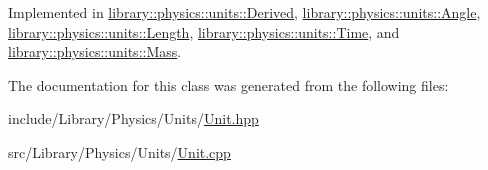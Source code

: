 Implemented in \hyperlink{classlibrary_1_1physics_1_1units_1_1_derived_a3626d6c77e6753f44232067856fde9d1}{library\+::physics\+::units\+::\+Derived}, \hyperlink{classlibrary_1_1physics_1_1units_1_1_angle_aae6b7bd4e028ea7719f5a712ca19a86c}{library\+::physics\+::units\+::\+Angle}, \hyperlink{classlibrary_1_1physics_1_1units_1_1_length_aea1d96e6930f7e6e6383e78c55219a64}{library\+::physics\+::units\+::\+Length}, \hyperlink{classlibrary_1_1physics_1_1units_1_1_time_a6f56977493a45d334bb53bc4246888c4}{library\+::physics\+::units\+::\+Time}, and \hyperlink{classlibrary_1_1physics_1_1units_1_1_mass_a6e7757920752ac9f6918525d6fadb31e}{library\+::physics\+::units\+::\+Mass}.



The documentation for this class was generated from the following files\+:\begin{DoxyCompactItemize}
\item 
include/\+Library/\+Physics/\+Units/\hyperlink{_unit_8hpp}{Unit.\+hpp}\item 
src/\+Library/\+Physics/\+Units/\hyperlink{_unit_8cpp}{Unit.\+cpp}\end{DoxyCompactItemize}
